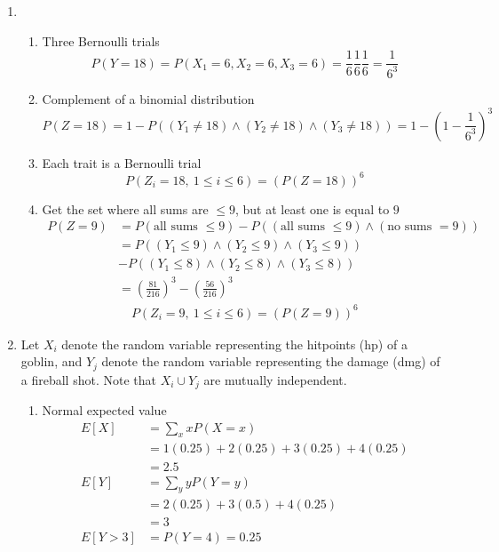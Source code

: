 \documentclass{article}
\begin{document}
	\begin{enumerate}
		\item 
		\begin{enumerate}
			\item Three Bernoulli trials
			\begin{equation*}
				P(Y=18)=P(X_1=6,X_2=6,X_3=6)=\frac{1}{6}\frac{1}{6}\frac{1}{6}=\frac{1}{6^3}
			\end{equation*}
			
			\item Complement of a binomial distribution
			\begin{equation*}
				P(Z=18)=1-P((Y_1\ne 18)\land (Y_2\ne 18)\land (Y_3\ne 18))=1-\left(1-\frac{1}{6^3}\right)^3
			\end{equation*}
			
			\item Each trait is a Bernoulli trial
			\begin{equation*}
				P(Z_i=18,\ 1\le i\le 6)=(P(Z=18))^6
			\end{equation*}
			
			\item Get the set where all sums are $\le 9$, but at least one is equal to $9$
			\begin{align*}
				P(Z=9)&=P(\text{all sums }\le 9)-P((\text{all sums }\le9)\land(\text{no sums }=9))\\
				&=P((Y_1\le 9)\land (Y_2\le 9)\land(Y_3\le 9))\\
				&-P((Y_1\le 8)\land (Y_2\le 8)\land(Y_3\le 8))\\
				&=\left(\frac{81}{216}\right)^3-\left(\frac{56}{216}\right)^3
			\end{align*}
			\begin{gather*}
				P(Z_i=9,\ 1\le i\le 6)=(P(Z=9))^6
			\end{gather*}
		\end{enumerate}
	
		\clearpage
		\item
		Let $X_i$ denote the random variable representing the hitpoints (hp) of a goblin, and $Y_j$ denote the random variable representing the damage (dmg) of a fireball shot. Note that $X_i\cup Y_j$ are mutually independent.
		
		\begin{enumerate}
			\item Normal expected value
			\begin{align*}
				E[X]&=\sum_{x} xP(X=x)\\
				&=1(0.25)+2(0.25)+3(0.25)+4(0.25)\\
				&=2.5\\
				E[Y]&=\sum_{y}yP(Y=y)\\
				&=2(0.25)+3(0.5)+4(0.25)\\
				&=3\\
				E[Y>3]&=P(Y=4)=0.25
			\end{align*}
			

\end{enumerate}
\end{enumerate}
\end{document}

